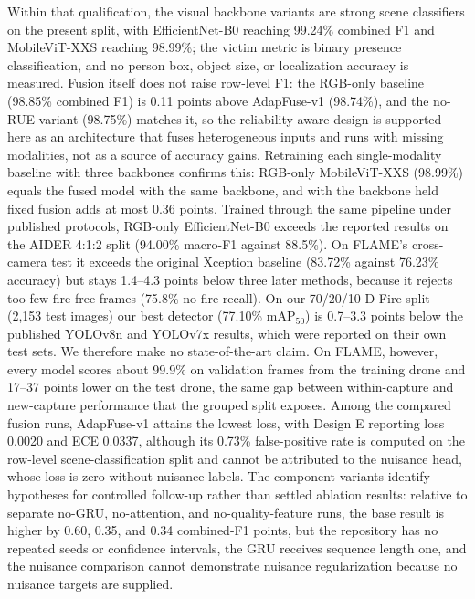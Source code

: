 Within that qualification, the visual backbone variants are strong scene classifiers on the present split, with EfficientNet-B0 reaching 99.24\% combined F1 and MobileViT-XXS reaching 98.99\%; the victim metric is binary presence classification, and no person box, object size, or localization accuracy is measured. Fusion itself does not raise row-level F1: the RGB-only baseline (98.85\% combined F1) is 0.11 points above AdapFuse-v1 (98.74\%), and the no-RUE variant (98.75\%) matches it, so the reliability-aware design is supported here as an architecture that fuses heterogeneous inputs and runs with missing modalities, not as a source of accuracy gains. Retraining each single-modality baseline with three backbones confirms this: RGB-only MobileViT-XXS (98.99\%) equals the fused model with the same backbone, and with the backbone held fixed fusion adds at most 0.36 points. Trained through the same pipeline under published protocols, RGB-only EfficientNet-B0 exceeds the reported results on the AIDER 4:1:2 split (94.00\% macro-F1 against 88.5\%). On FLAME's cross-camera test it exceeds the original Xception baseline (83.72\% against 76.23\% accuracy) but stays 1.4--4.3 points below three later methods, because it rejects too few fire-free frames (75.8\% no-fire recall). On our 70/20/10 D-Fire split (2{,}153 test images) our best detector (77.10\% mAP$_{50}$) is 0.7--3.3 points below the published YOLOv8n and YOLOv7x results, which were reported on their own test sets. We therefore make no state-of-the-art claim. On FLAME, however, every model scores about 99.9\% on validation frames from the training drone and 17--37 points lower on the test drone, the same gap between within-capture and new-capture performance that the grouped split exposes. Among the compared fusion runs, AdapFuse-v1 attains the lowest loss, with Design E reporting loss 0.0020 and ECE 0.0337, although its 0.73\% false-positive rate is computed on the row-level scene-classification split and cannot be attributed to the nuisance head, whose loss is zero without nuisance labels. The component variants identify hypotheses for controlled follow-up rather than settled ablation results: relative to separate no-GRU, no-attention, and no-quality-feature runs, the base result is higher by 0.60, 0.35, and 0.34 combined-F1 points, but the repository has no repeated seeds or confidence intervals, the GRU receives sequence length one, and the nuisance comparison cannot demonstrate nuisance regularization because no nuisance targets are supplied.

